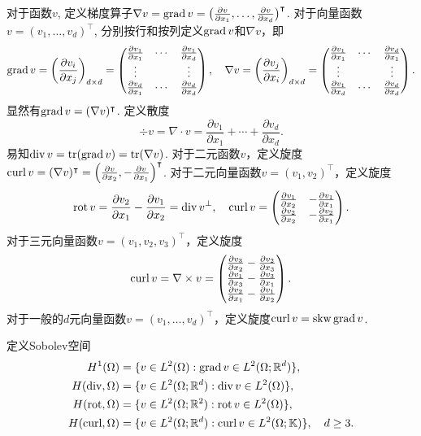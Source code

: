 对于函数$v$, 定义梯度算子$\nabla v=\operatorname{grad} v=\big(\frac{\partial v}{\partial x_1}, \ldots, \frac{\partial v}{\partial x_d}\big)^{\intercal}$.
对于向量函数$v=(v_1, \ldots, v_d)^{\intercal}$, 分别按行和按列定义$\operatorname{grad} v$和$\nabla v$，即
$$
\operatorname{grad} v=\left(\frac{\partial v_i}{\partial x_j}\right)_{d\times d}=\begin{pmatrix}
\frac{\partial v_1}{\partial x_1} & \cdots & \frac{\partial v_1}{\partial x_d} \\
\vdots &  & \vdots \\
\frac{\partial v_d}{\partial x_1} & \cdots & \frac{\partial v_d}{\partial x_d} 
\end{pmatrix},\quad \nabla v=\left(\frac{\partial v_j}{\partial x_i}\right)_{d\times d}=\begin{pmatrix}
\frac{\partial v_1}{\partial x_1} & \cdots & \frac{\partial v_d}{\partial x_1} \\
\vdots &  & \vdots \\
\frac{\partial v_1}{\partial x_d} & \cdots & \frac{\partial v_d}{\partial x_d} 
\end{pmatrix}.
$$
显然有$\operatorname{grad} v=(\nabla v)^{\intercal}$. 定义散度
$$
\div v=\nabla \cdot v=\frac{\partial v_1}{\partial x_1}+\cdots+\frac{\partial v_d}{\partial x_d}.
$$
易知$\operatorname{div} v=\operatorname*{tr}(\operatorname{grad} v)=\operatorname*{tr}(\nabla v)$. 对于二元函数$v$，定义旋度$\operatorname{curl} v=(\nabla v)^{\intercal}=\left(\frac{\partial v}{\partial x_2}, -\frac{\partial v}{\partial x_1}\right)^{\intercal}$. 对于二元向量函数$v=(v_1, v_2)^{\intercal}$，定义旋度
$$
\operatorname*{rot} v=\frac{\partial v_2}{\partial x_1}-\frac{\partial v_1}{\partial x_2}=\operatorname{div} v^{\perp},\quad \operatorname{curl} v=\begin{pmatrix}
\frac{\partial v_1}{\partial x_2} & -\frac{\partial v_1}{\partial x_1} \\
\frac{\partial v_2}{\partial x_2} & -\frac{\partial v_2}{\partial x_1}
\end{pmatrix}.
$$
对于三元向量函数$v=(v_1, v_2, v_3)^{\intercal}$，定义旋度
$$
\operatorname{curl} v=\nabla\times v=\begin{pmatrix}
\frac{\partial v_3}{\partial x_2} - \frac{\partial v_2}{\partial x_3} \\
\frac{\partial v_1}{\partial x_3} - \frac{\partial v_3}{\partial x_1} \\
\frac{\partial v_2}{\partial x_1} - \frac{\partial v_1}{\partial x_2}
\end{pmatrix}.
$$
对于一般的$d$元向量函数$v=(v_1, \ldots, v_d)^{\intercal}$，定义旋度$\operatorname{curl} v=\operatorname{skw}\operatorname{grad} v$.


定义Sobolev空间
\begin{align*}
H^1(\Omega) &=\{v\in L^2(\Omega): \operatorname{grad} v\in L^2(\Omega;\mathbb R^d)\}, \\
H(\operatorname{div}, \Omega) &=\{v\in L^2(\Omega;\mathbb R^d): \operatorname{div} v\in L^2(\Omega)\}, \\
H(\operatorname*{rot}, \Omega) &=\{v\in L^2(\Omega;\mathbb R^2): \operatorname*{rot} v\in L^2(\Omega)\}, \\
H(\operatorname{curl}, \Omega) &=\{v\in L^2(\Omega;\mathbb R^d): \operatorname{curl} v\in L^2(\Omega;\mathbb K)\}, \quad d\geq3.
\end{align*}

